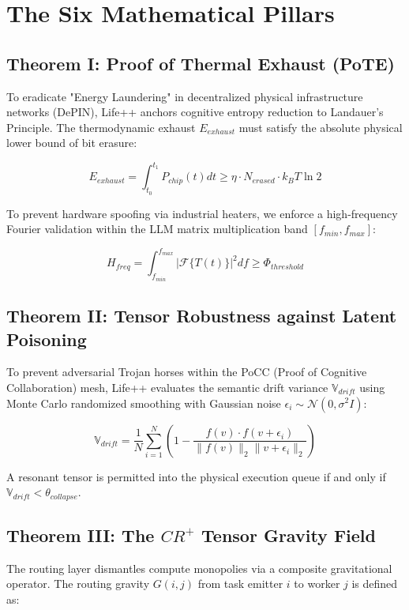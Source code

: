 \documentclass[conference]{IEEEtran}
\begin{document}
\section{The Six Mathematical Pillars}

\subsection{Theorem I: Proof of Thermal Exhaust (PoTE)}
To eradicate "Energy Laundering" in decentralized physical infrastructure networks (DePIN), Life++ anchors cognitive entropy reduction to Landauer's Principle. The thermodynamic exhaust $E_{exhaust}$ must satisfy the absolute physical lower bound of bit erasure:

\begin{equation}
E_{exhaust} = \int_{t_0}^{t_1} P_{chip}(t) dt \ge \eta \cdot N_{erased} \cdot k_B T \ln 2
\end{equation}

To prevent hardware spoofing via industrial heaters, we enforce a high-frequency Fourier validation within the LLM matrix multiplication band $[f_{min}, f_{max}]$:

\begin{equation}
H_{freq} = \int_{f_{min}}^{f_{max}} |\mathcal{F}\{T(t)\}|^2 df \ge \Phi_{threshold}
\end{equation}

\subsection{Theorem II: Tensor Robustness against Latent Poisoning}
To prevent adversarial Trojan horses within the PoCC (Proof of Cognitive Collaboration) mesh, Life++ evaluates the semantic drift variance $\mathbb{V}_{drift}$ using Monte Carlo randomized smoothing with Gaussian noise $\epsilon_i \sim \mathcal{N}(0, \sigma^2 I)$:

\begin{equation}
\mathbb{V}_{drift} = \frac{1}{N} \sum_{i=1}^{N} \left( 1 - \frac{f(v) \cdot f(v + \epsilon_i)}{\|f(v)\|_2 \|v + \epsilon_i\|_2} \right)
\end{equation}

A resonant tensor is permitted into the physical execution queue if and only if $\mathbb{V}_{drift} < \theta_{collapse}$.

\subsection{Theorem III: The $CR^+$ Tensor Gravity Field}
The routing layer dismantles compute monopolies via a composite gravitational operator. The routing gravity $G(i, j)$ from task emitter $i$ to worker $j$ is defined as:
\end{document}
